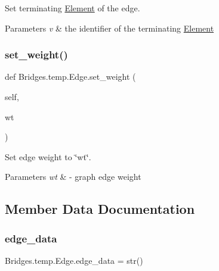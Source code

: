 Set terminating \mbox{\hyperlink{namespace_bridges_1_1_element}{Element}} of the edge. 


\begin{DoxyParams}{Parameters}
{\em v} & the identifier of the terminating \mbox{\hyperlink{namespace_bridges_1_1_element}{Element}} \\
\hline
\end{DoxyParams}
\mbox{\label{class_bridges_1_1temp_1_1_edge_aef8afe938081b6033a794d70eb760491}} 
\subsubsection{\texorpdfstring{set\+\_\+weight()}{set\_weight()}}
{\footnotesize\ttfamily def Bridges.\+temp.\+Edge.\+set\+\_\+weight (\begin{DoxyParamCaption}\item[{}]{self,  }\item[{}]{wt }\end{DoxyParamCaption})}



Set edge weight to \char`\"{}wt\char`\"{}. 


\begin{DoxyParams}{Parameters}
{\em wt} & -\/ graph edge weight \\
\hline
\end{DoxyParams}


\subsection{Member Data Documentation}
\mbox{\label{class_bridges_1_1temp_1_1_edge_a34c9d5c0ba1f62155b267e921c50d42d}} 
\subsubsection{\texorpdfstring{edge\+\_\+data}{edge\_data}}
{\footnotesize\ttfamily Bridges.\+temp.\+Edge.\+edge\+\_\+data = str()\hspace{0.3cm}{\ttfamily [static]}}

